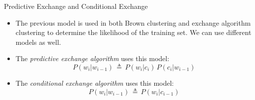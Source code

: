 \documentclass[xcolor=pdftex,x11names,table,hyperref]{beamer}
\begin{document}
\begin{frame}{Predictive Exchange and Conditional Exchange}
\begin{itemize}
	\item The previous model is used in both Brown clustering and exchange algorithm clustering to determine the likelihood of the training set.
	We can use different models as well.
	\pause
	\item The \emph{predictive exchange algorithm} uses this model:
	\begin{equation*}
		P(w_i|w_{i-1}) \,\triangleq\, P(w_i | c_i) \, P(c_i | w_{i-1})
	\end{equation*}
	\item The \emph{conditional exchange algorithm} uses this model:
	\begin{equation*}
		P(w_i|w_{i-1}) \,\triangleq\, P(w_i | c_{i-1})
	\end{equation*}
\end{itemize}
\end{frame}






\end{document}
